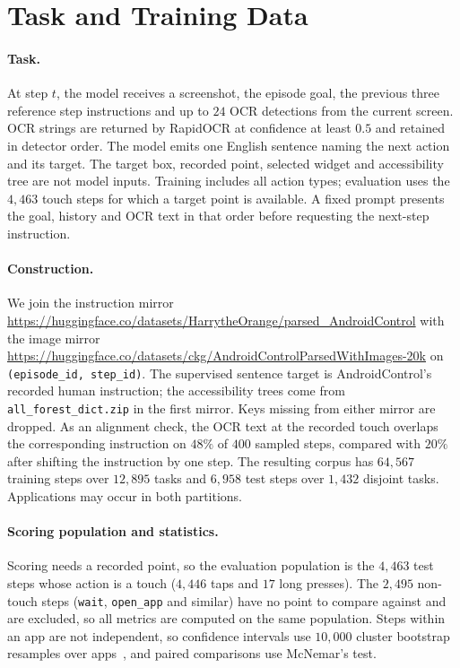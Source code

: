 \documentclass[runningheads,a4paper]{llncs}
\begin{document}
\section{Task and Training Data}
\label{sec:data}

\paragraph{Task.}
At step $t$, the model receives a screenshot, the episode goal, the previous three reference step
instructions and up to $24$ OCR detections from the current screen. OCR strings are returned by
RapidOCR at confidence at least $0.5$ and retained in detector order. The model emits one English
sentence naming the next action and its target. The target box, recorded point, selected widget
and accessibility tree are not model inputs. Training includes all action types; evaluation uses
the $4{,}463$ touch steps for which a target point is available. A fixed prompt presents the goal,
history and OCR text in that order before requesting the next-step instruction.

\paragraph{Construction.}
We join the instruction mirror
\url{https://huggingface.co/datasets/HarrytheOrange/parsed_AndroidControl} with the image mirror
\url{https://huggingface.co/datasets/ckg/AndroidControlParsedWithImages-20k} on
\texttt{(episode\_id, step\_id)}. The supervised sentence target is AndroidControl's recorded
human instruction; the accessibility trees come from \texttt{all\_forest\_dict.zip} in the first
mirror. Keys missing from either mirror are dropped. As an alignment check, the
OCR text at the recorded touch overlaps the corresponding instruction on $48\%$ of $400$ sampled
steps, compared with $20\%$ after shifting the instruction by one step. The resulting corpus has
$64{,}567$ training steps over $12{,}895$ tasks and $6{,}958$ test steps over $1{,}432$ disjoint
tasks. Applications may occur in both partitions.

\paragraph{Scoring population and statistics.}
Scoring needs a recorded point, so the evaluation population is the $4{,}463$ test steps whose
action is a touch ($4{,}446$ taps and $17$ long presses). The $2{,}495$ non-touch steps
(\texttt{wait}, \texttt{open\_app} and similar) have no point to compare against and are
excluded, so all metrics are computed on the same population. Steps within an app are not
independent, so confidence intervals use $10{,}000$ cluster bootstrap resamples over
apps~\cite{cameron2008}, and paired comparisons use McNemar's test.
\end{document}
